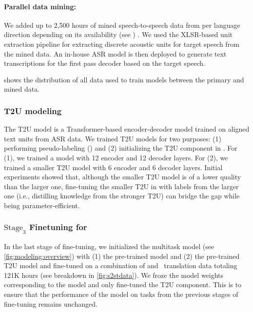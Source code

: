 \paragraph{Parallel data mining: \mineddata}
We added up to 2,500 hours of mined speech-to-speech data from \mineddata per language direction depending on its availability (see ) . We used the XLSR-based unit extraction pipeline for extracting discrete acoustic units for target speech from the mined data. An in-house ASR model is then deployed to generate text transcriptions for the first pass decoder based on the target speech.


 shows the distribution of all \sst data used to train \mfourt models between the primary and mined data.

\subsubsection{T2U modeling}\label{sec:modeling:s2st:t2u}
The T2U model is a Transformer-based encoder-decoder model trained on aligned text units from ASR data.
We trained T2U models for two purposes: (1) performing pseudo-labeling () and (2) initializing the T2U component in \unity. 
For (1), 
we trained a model with 12 encoder and 12 decoder layers.
For (2), we trained a smaller T2U model with 6 encoder and 6 decoder layers.
Initial experiments showed that, although the smaller T2U model is of a lower quality than the larger one, fine-tuning the smaller T2U in \unity with labels from the larger one (i.e., distilling knowledge from the stronger T2U) can bridge the gap while being parameter-efficient.


\subsubsection{$\text{Stage}_3$ Finetuning for \sst}\label{sec:modeling:s2st:stage3}
In the last stage of fine-tuning, we initialized the multitask \unity model (see \cref{fig:modeling:overview}) with (1) the pre-trained \xt model and (2) the pre-trained T2U model and fine-tuned on a combination of \xeng and \engx~\sst translation data totaling 121K hours (see breakdown in \cref{fig:s2stdata}).
We froze the model weights corresponding to the \xt model and only fine-tuned the T2U component. This is to ensure that the performance of the model on tasks from the previous stages of fine-tuning remains unchanged. 

